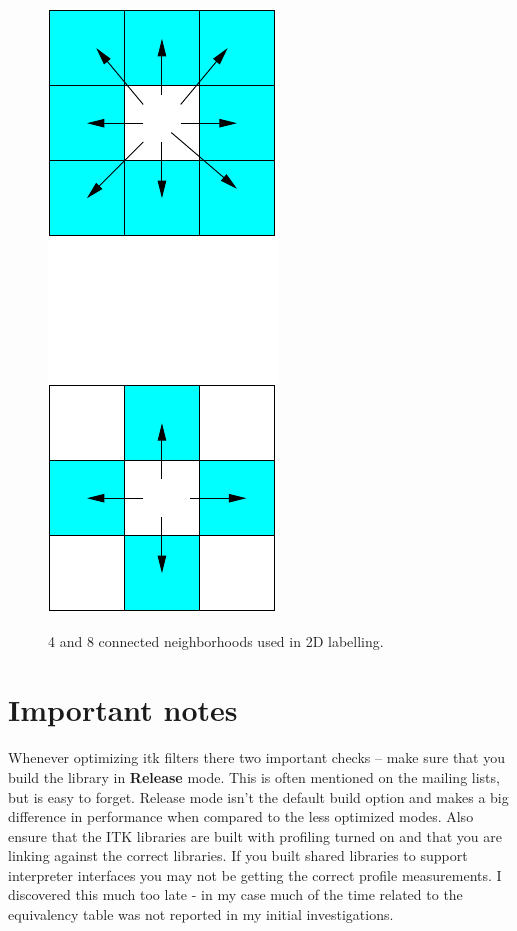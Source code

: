 \documentclass{InsightArticle}
\begin{document}
\begin{figure}[htbp]
\begin{center}
\includegraphics{connect}
\label{fig:neigh}
\caption{4 and 8 connected neighborhoods used in 2D labelling.}
\end{center}
\end{figure}

\section{Important notes}
Whenever optimizing itk filters there two important checks -- make
sure that you build the library in {\bf Release} mode. This is often
mentioned on the mailing lists, but is easy to forget. Release mode
isn't the default build option and makes a big difference in
performance when compared to the less optimized modes. Also ensure
that the ITK libraries are built with profiling turned on and that you
are linking against the correct libraries. If you built shared
libraries to support interpreter interfaces you may not be getting the
correct profile measurements. I discovered this much too late - in my
case much of the time related to the equivalency table was not
reported in my initial investigations.
\end{document}
